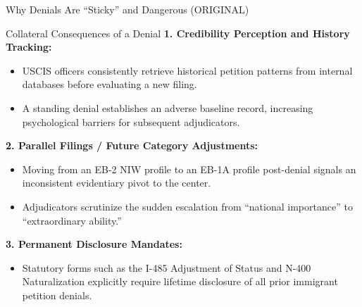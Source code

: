 \documentclass[11pt]{beamer}
\begin{document}
	\begin{frame}{Why Denials Are ``Sticky'' and Dangerous (ORIGINAL)}
		\scriptsize
		\begin{block}{Collateral Consequences of a Denial}
			\textbf{1. Credibility Perception and History Tracking:}
			\begin{itemize}
				\item USCIS officers consistently retrieve historical petition patterns from internal databases before evaluating a new filing.
				\item A standing denial establishes an adverse baseline record, increasing psychological barriers for subsequent adjudicators.
			\end{itemize}
			\textbf{2. Parallel Filings / Future Category Adjustments:}
			\begin{itemize}
				\item Moving from an EB-2 NIW profile to an EB-1A profile post-denial signals an inconsistent evidentiary pivot to the center.
				\item Adjudicators scrutinize the sudden escalation from ``national importance'' to ``extraordinary ability.''
			\end{itemize}
			\textbf{3. Permanent Disclosure Mandates:}
			\begin{itemize}
				\item Statutory forms such as the I-485 Adjustment of Status and N-400 Naturalization explicitly require lifetime disclosure of all prior immigrant petition denials.
			\end{itemize}
		\end{block}
	\end{frame}
	
	
\end{document}
